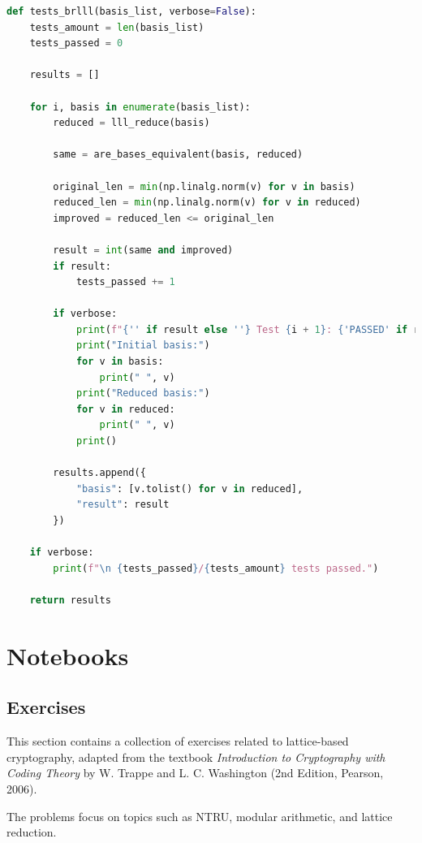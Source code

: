\documentclass[a4paper,12pt]{article}
\begin{document}
\begin{lstlisting}[language=Python]
def tests_brlll(basis_list, verbose=False):
    tests_amount = len(basis_list)
    tests_passed = 0

    results = []

    for i, basis in enumerate(basis_list):
        reduced = lll_reduce(basis)

        same = are_bases_equivalent(basis, reduced)

        original_len = min(np.linalg.norm(v) for v in basis)
        reduced_len = min(np.linalg.norm(v) for v in reduced)
        improved = reduced_len <= original_len

        result = int(same and improved)
        if result:
            tests_passed += 1

        if verbose:
            print(f"{'' if result else ''} Test {i + 1}: {'PASSED' if result else 'FAILED'}")
            print("Initial basis:")
            for v in basis:
                print(" ", v)
            print("Reduced basis:")
            for v in reduced:
                print(" ", v)
            print()

        results.append({
            "basis": [v.tolist() for v in reduced],
            "result": result
        })

    if verbose:
        print(f"\n {tests_passed}/{tests_amount} tests passed.")

    return results
\end{lstlisting}
\newpage










\section{Notebooks}
\subsection{Exercises}
This section contains a collection of exercises related to lattice-based cryptography,  
adapted from the textbook \textit{Introduction to Cryptography with Coding Theory}  
by W. Trappe and L. C. Washington (2nd Edition, Pearson, 2006).  

The problems focus on topics such as NTRU, modular arithmetic, and lattice reduction.
\end{document}
